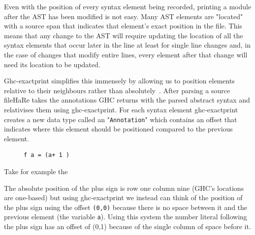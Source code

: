 Even with the position of every syntax element being recorded, printing a module after the AST has been modified is not easy. Many AST elements are "located" with a source span that indicates that element's exact position in the file. This means that any change to the AST will require updating the location of all the syntax elements that occur later in the line at least for single line changes and, in the case of changes that modify entire lines, every element after that change will need its location to be updated.

Ghc-exactprint simplifies this immensely by allowing us to position elements relative to their neighbours rather than absolutely~\citep{exactprint}. After parsing a source file\DIFaddbegin \DIFadd{, }\DIFaddend HaRe takes the annotations GHC returns with the parsed abstract syntax and relativises them using ghc-exactprint. For each syntax element ghc-exactprint creates a new data type called an "\texttt{Annotation}" which contains an offset that indicates where this element should be positioned compared to the previous element.
\DIFaddbegin 

\begin{figure}[t]
\begin{lstlisting} 
f a = (a+ 1 )
\end{lstlisting}
\caption{}
\label{strangeSpacing}
\end{figure}


\DIFaddend Take for example the \DIFdelbegin {}%


\DIFdelend \DIFaddbegin {}\DIFaddend The absolute position of the plus sign is row one column nine (GHC's locations are one-based) but using ghc-exactprint we instead can think of the position of the plus sign using the offset \texttt{(0,0)} because there is no space between it and the previous element (the variable \texttt{a}). Using this system the number literal following the plus sign has an offset of (0,1) because of the single column of space before it. 

